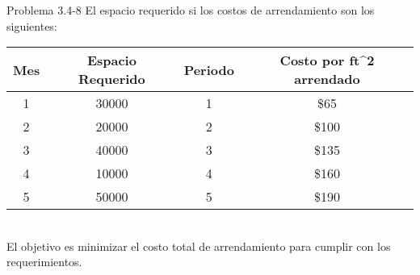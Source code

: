 \documentclass{beamer}
\begin{document}
\begin{frame}[t,fragile]{Problema 3.4-8 }
El espacio requerido si los costos de arrendamiento son los siguientes:
\begin{tabular}{|c|c|c|c|}
\hline 
Mes & Espacio Requerido & Periodo & Costo por ft^2 arrendado \\ 
\hline 
1 & 30000 & 1 & \$65 \\ 
\hline 
2 & 20000 & 2 & \$100 \\ 
\hline 
3 & 40000 & 3 & \$135 \\ 
\hline 
4 & 10000 & 4 & \$160 \\ 
\hline 
5 & 50000 & 5 & \$190 \\ 
\hline 
\end{tabular} \\
El objetivo es minimizar el costo total de arrendamiento para cumplir con los requerimientos.
\end{frame}
\end{document}
